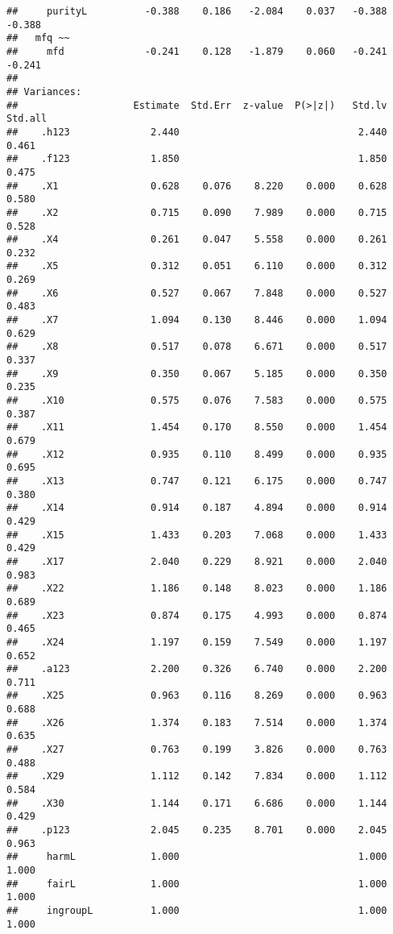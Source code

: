 \documentclass[english,man]{apa6}
\theoremstyle{definition}
\theoremstyle{definition}
\theoremstyle{definition}
\theoremstyle{remark}
\begin{document}
\begin{verbatim}
##     purityL          -0.388    0.186   -2.084    0.037   -0.388   -0.388
##   mfq ~~                                                                
##     mfd              -0.241    0.128   -1.879    0.060   -0.241   -0.241
## 
## Variances:
##                    Estimate  Std.Err  z-value  P(>|z|)   Std.lv  Std.all
##    .h123              2.440                               2.440    0.461
##    .f123              1.850                               1.850    0.475
##    .X1                0.628    0.076    8.220    0.000    0.628    0.580
##    .X2                0.715    0.090    7.989    0.000    0.715    0.528
##    .X4                0.261    0.047    5.558    0.000    0.261    0.232
##    .X5                0.312    0.051    6.110    0.000    0.312    0.269
##    .X6                0.527    0.067    7.848    0.000    0.527    0.483
##    .X7                1.094    0.130    8.446    0.000    1.094    0.629
##    .X8                0.517    0.078    6.671    0.000    0.517    0.337
##    .X9                0.350    0.067    5.185    0.000    0.350    0.235
##    .X10               0.575    0.076    7.583    0.000    0.575    0.387
##    .X11               1.454    0.170    8.550    0.000    1.454    0.679
##    .X12               0.935    0.110    8.499    0.000    0.935    0.695
##    .X13               0.747    0.121    6.175    0.000    0.747    0.380
##    .X14               0.914    0.187    4.894    0.000    0.914    0.429
##    .X15               1.433    0.203    7.068    0.000    1.433    0.429
##    .X17               2.040    0.229    8.921    0.000    2.040    0.983
##    .X22               1.186    0.148    8.023    0.000    1.186    0.689
##    .X23               0.874    0.175    4.993    0.000    0.874    0.465
##    .X24               1.197    0.159    7.549    0.000    1.197    0.652
##    .a123              2.200    0.326    6.740    0.000    2.200    0.711
##    .X25               0.963    0.116    8.269    0.000    0.963    0.688
##    .X26               1.374    0.183    7.514    0.000    1.374    0.635
##    .X27               0.763    0.199    3.826    0.000    0.763    0.488
##    .X29               1.112    0.142    7.834    0.000    1.112    0.584
##    .X30               1.144    0.171    6.686    0.000    1.144    0.429
##    .p123              2.045    0.235    8.701    0.000    2.045    0.963
##     harmL             1.000                               1.000    1.000
##     fairL             1.000                               1.000    1.000
##     ingroupL          1.000                               1.000    1.000

\end{verbatim}
\end{document}
